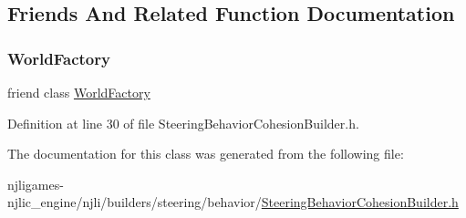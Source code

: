 \subsection{Friends And Related Function Documentation}
\mbox{\label{classnjli_1_1_steering_behavior_cohesion_builder_acb96ebb09abe8f2a37a915a842babfac}} 
\subsubsection{\texorpdfstring{World\+Factory}{WorldFactory}}
{\footnotesize\ttfamily friend class \mbox{\hyperlink{classnjli_1_1_world_factory}{World\+Factory}}\hspace{0.3cm}{\ttfamily [friend]}}



Definition at line 30 of file Steering\+Behavior\+Cohesion\+Builder.\+h.



The documentation for this class was generated from the following file\+:\begin{DoxyCompactItemize}
\item 
njligames-\/njlic\+\_\+engine/njli/builders/steering/behavior/\mbox{\hyperlink{_steering_behavior_cohesion_builder_8h}{Steering\+Behavior\+Cohesion\+Builder.\+h}}\end{DoxyCompactItemize}
